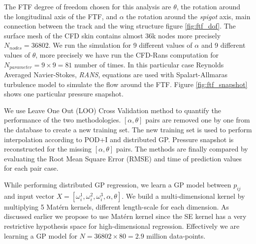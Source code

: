 The FTF degree of freedom chosen for this analysis are $\theta$, the rotation around the longitudinal axis of the FTF, and $\alpha$ the rotation around the {\it spigot} axis, main connection between the track and the wing structure figure \ref{fig:ftf_dof}. The surface mesh of the CFD skin contains almost 36k nodes more precisely $N_{nodes} = 36802$. We run the simulation for 9 different values of $\alpha$ and 9 different values of $\theta$, more precisely we have run the CFD-Rans computation for $N_{parameter} = 9\times9 = 81$ number of times. In this particular case Reynolds Averaged  Navier-Stokes, {\it RANS}, equations are used with Spalart-Allmaras turbulence model to simulate the flow around the FTF. Figure \ref{fig:ftf_snapshot} shows one particular pressure snapshot. 

We use Leave One Out (LOO) Cross Validation method to quantify the performance of the two methodologies. $[\alpha, \theta]$ pairs are removed one by one from the database to create a new training set. The new training set is used to perform interpolation according to POD+I and distributed GP. Pressure snapshot is reconstructed for the missing $[\alpha, \theta]$ pairs. The methods are finally compared by evaluating the Root Mean Square Error (RMSE) and time of prediction values for each pair case. 

While performing distributed GP regression, we learn a GP model between $p_{ij}$ and input vector $X = [\omega_{i}^{1}, \omega_{i}^{2}, \omega_{i}^{3}, \alpha, \theta]$. We build a multi-dimensional kernel by multiplying 5 Mat\'ern kernels, different length-scale for each dimension. As discussed earlier we propose to use Mat\'ern kernel since the SE kernel has a very restrictive hypothesis space for high-dimensional regression.  Effectively we are learning a GP model for $N = 36802\times80 = 2.9$ million data-points. 

